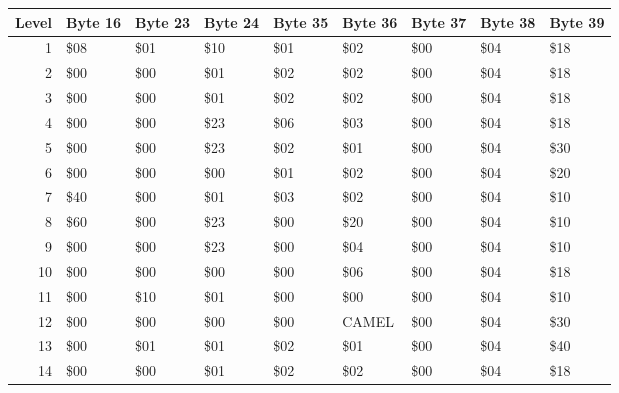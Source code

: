 \begin{figure}[H]
  {
  \setlength{\tabcolsep}{3.0pt}
  \setlength\cmidrulewidth{\heavyrulewidth} %
  \begin{adjustbox}{width=\textwidth}

\begin{tabular}{rllllllll}
\toprule
   Level & Byte 16   & Byte 23   & Byte 24   & Byte 35   & Byte 36   & Byte 37   & Byte 38   & Byte 39   \\
\midrule
       1 & \$08       & \$01       & \$10       & \$01       & \$02       & \$00       & \$04       & \$18       \\
       2 & \$00       & \$00       & \$01       & \$02       & \$02       & \$00       & \$04       & \$18       \\
       3 & \$00       & \$00       & \$01       & \$02       & \$02       & \$00       & \$04       & \$18       \\
       4 & \$00       & \$00       & \$23       & \$06       & \$03       & \$00       & \$04       & \$18       \\
       5 & \$00       & \$00       & \$23       & \$02       & \$01       & \$00       & \$04       & \$30       \\
       6 & \$00       & \$00       & \$00       & \$01       & \$02       & \$00       & \$04       & \$20       \\
       7 & \$40       & \$00       & \$01       & \$03       & \$02       & \$00       & \$04       & \$10       \\
       8 & \$60       & \$00       & \$23       & \$00       & \$20       & \$00       & \$04       & \$10       \\
       9 & \$00       & \$00       & \$23       & \$00       & \$04       & \$00       & \$04       & \$10       \\
      10 & \$00       & \$00       & \$00       & \$00       & \$06       & \$00       & \$04       & \$18       \\
      11 & \$00       & \$10       & \$01       & \$00       & \$00       & \$00       & \$04       & \$10       \\
      12 & \$00       & \$00       & \$00       & \$00       & CAMEL     & \$00       & \$04       & \$30       \\
      13 & \$00       & \$01       & \$01       & \$02       & \$01       & \$00       & \$04       & \$40       \\
      14 & \$00       & \$00       & \$01       & \$02       & \$02       & \$00       & \$04       & \$18       \\

\end{tabular}
\end{adjustbox}}
\end{figure}
